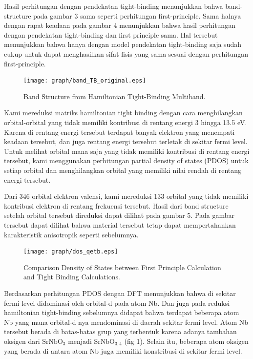 \documentclass{aip-cp}
\begin{document}
Hasil perhitungan dengan pendekatan tight-binding menunjukkan bahwa band-structure pada gambar 3 sama seperti perhitungan first-principle. Sama halnya dengan rapat keadaan pada gambar 4 menunjukkan bahwa hasil perhitungan dengan pendekatan tight-binding dan first principle sama. Hal tersebut menunjukkan bahwa hanya dengan model pendekatan tight-binding saja sudah cukup untuk dapat menghasilkan sifat fisis yang sama sesuai dengan perhitungan first-principle.

\begin{figure}[b]
  \centerline{\texttt{[image: graph/band\_TB\_original.eps]}}
  \caption{Band Structure from Hamiltonian Tight-Binding Multiband.}
\end{figure}

Kami mereduksi matriks hamiltonian tight binding dengan cara menghilangkan orbital-orbital yang tidak memiliki kontribusi di rentang energi 3 hingga 13.5 eV. Karena di rentang energi tersebut terdapat banyak elektron yang menempati keadaan tersebut, dan juga rentang energi tersebut terletak di sekitar fermi level. Untuk melihat orbital mana saja yang tidak memiliki kontribusi di rentang energi tersebut, kami menggunakan perhitungan partial density of states (PDOS) untuk setiap orbital dan menghilangkan orbital yang memiliki nilai rendah di rentang energi tersebut.

Dari 346 orbital elektron valensi, kami mereduksi 133 orbital yang tidak memiliki kontribusi elektron di rentang frekuensi tersebut. Hasil dari band structure setelah orbital tersebut direduksi dapat dilihat pada gambar 5. Pada gambar tersebut dapat dilihat bahwa material tersebut tetap dapat mempertahankan karakteristik anisotropik seperti sebelumnya.

\begin{figure}[h]
  \centerline{\texttt{[image: graph/dos\_qetb.eps]}}
  \caption{Comparison Density of States between First Principle Calculation and Tight Binding Calculations.}
\end{figure}

Berdasarkan perhitungan PDOS dengan DFT menunjukkan bahwa di sekitar fermi level didominasi oleh orbital-d pada atom Nb\cite{Wan2017}. Dan juga pada reduksi hamiltonian tight-binding sebelumnya didapat bahwa terdapat beberapa atom Nb yang mana orbital-d nya mendominasi di daerah sekitar fermi level. Atom Nb tersebut berada di batas-batas grup yang terbentuk karena adanya tambahan oksigen dari $\mathrm{SrNbO_{3}}$ menjadi $\mathrm{SrNbO_{3,4}}$ (fig 1). Selain itu, beberapa atom oksigen yang berada di antara atom Nb juga memiliki konstribusi di sekitar fermi level.
\end{document}
